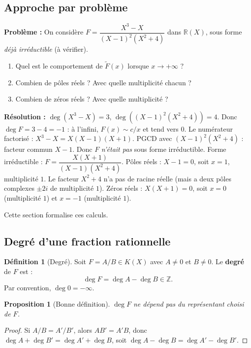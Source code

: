 \documentclass[12pt,a4paper]{report}
\newtheorem{proposition}[theoreme]{Proposition}
\theoremstyle{definition}
\newtheorem{definition}{Définition}[section]
\theoremstyle{remark}
\begin{document}
\subsection{Approche par problème}
\textbf{Problème :} On considère $F = \dfrac{X^3 - X}{(X - 1)^2 (X^2 + 4)}$ dans $\mathbb{R}(X)$, sous forme \emph{déjà irréductible} (à vérifier).
\begin{enumerate}
    \item Quel est le comportement de $\widetilde{F}(x)$ lorsque $x \to +\infty$ ?
    \item Combien de pôles réels ? Avec quelle multiplicité chacun ?
    \item Combien de zéros réels ? Avec quelle multiplicité ?
\end{enumerate}

\textbf{Résolution :}
$\deg(X^3 - X) = 3$, $\deg((X-1)^2 (X^2 + 4)) = 4$. Donc $\deg F = 3 - 4 = -1$ : à l'infini, $F(x) \sim c/x$ et tend vers $0$.
Le numérateur factorisé : $X^3 - X = X(X - 1)(X + 1)$. PGCD avec $(X - 1)^2 (X^2 + 4)$ : facteur commun $X - 1$. Donc $F$ \emph{n'était pas} sous forme irréductible.
Forme irréductible : $F = \dfrac{X(X + 1)}{(X - 1)(X^2 + 4)}$.
Pôles réels : $X - 1 = 0$, soit $x = 1$, multiplicité $1$. Le facteur $X^2 + 4$ n'a pas de racine réelle (mais a deux pôles complexes $\pm 2i$ de multiplicité $1$).
Zéros réels : $X(X + 1) = 0$, soit $x = 0$ (multiplicité $1$) et $x = -1$ (multiplicité $1$).

Cette section formalise ces calculs.

\subsection{Degré d'une fraction rationnelle}

\begin{definition}[Degré]
Soit $F = A/B \in K(X)$ avec $A \neq 0$ et $B \neq 0$. Le \textbf{degré} de $F$ est :
\[ \deg F = \deg A - \deg B \in \mathbb{Z}. \]
Par convention, $\deg 0 = -\infty$.
\end{definition}

\begin{proposition}[Bonne définition]
$\deg F$ ne dépend pas du représentant choisi de $F$.
\end{proposition}

\begin{proof}
Si $A/B = A'/B'$, alors $A B' = A' B$, donc $\deg A + \deg B' = \deg A' + \deg B$, soit $\deg A - \deg B = \deg A' - \deg B'$.
\end{proof}
\end{document}
